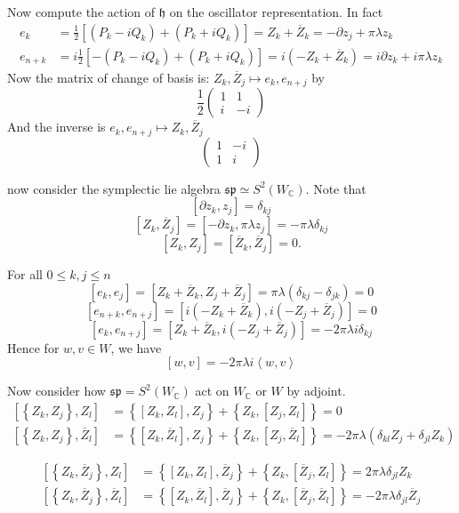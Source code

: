 \documentclass[12pt]{article}
\def\bC{{\mathbb{C}}}
\def\sp{{\mathfrak{sp}}}
\def\inn#1#2{\left\langle{#1},{#2}\right\rangle}
\def\barZ{{\overline{Z}}}
\def\fhh{\mathfrak{h}}
\def\pz#1{\partial z_{#1}}
\def\cmm#1#2{\left[{#1},{#2}\right]}
\def\acmm#1#2{\left\{{#1},{#2}\right\}}
\begin{document}
Now compute the action of $\fhh$ on the oscillator representation. 
In fact 
\[
\begin{split}
e_k &= \frac{1}{2}[(P_k-iQ_k) + (P_k + iQ_k)] =
Z_k + \barZ_k =  -\pz{j}  + \pi \lambda z_k\\
e_{n+k} & = i\frac{1}{2}[-(P_k-iQ_k) + (P_k + iQ_k)] = i(-Z_k+\barZ_k)
= i\pz{k} +i \pi \lambda z_k
\end{split}
\]
Now the matrix of change of basis is: $Z_k, \barZ_j \mapsto e_k, e_{n+j}$
by 
\begin{equation}\label{eq:tZtoe}
\frac{1}{2}\begin{pmatrix}
1 & 1\\
i & -i 
\end{pmatrix}
\end{equation}
And the inverse is $e_k, e_{n+j} \mapsto Z_k, \barZ_j$
\[
\begin{pmatrix}
1 & -i\\
1 & i
\end{pmatrix}
\]

now consider the symplectic lie algebra $\sp \simeq S^2(W_\bC)$. 
Note that 
\[
\cmm{\pz{k}}{z_j} = \delta_{kj}
\]
\[
\cmm{Z_k}{\barZ_j} = \cmm{-\pz{k}}{\pi \lambda z_j} = -\pi\lambda \delta_{kj}
\]
\[
\cmm{Z_k}{Z_j} = \cmm{\barZ_k}{\barZ_j} =0.
\]

For all $0\leq k,j \leq n$
\[
\cmm{e_k}{e_{j}}= \cmm{Z_k+\barZ_k}{Z_j+\barZ_j} = \pi\lambda (\delta_{kj}-\delta_{jk}) 
=0 
\]
\[
\cmm{e_{n+k}}{e_{n+j}} = \cmm{i(-Z_k+\barZ_k)}{i(-Z_j+\barZ_j)} = 0
\]
\[
\cmm{e_k}{e_{n+j}} = \cmm{Z_k + \barZ_k}{i(-Z_j+\barZ_j)} = -2\pi\lambda i \delta_{kj} 
\]
Hence for $w,v\in W$, we have 
\[
\cmm{w}{v}= - 2\pi \lambda i \inn{w}{v} 
\]

Now consider how $\sp = S^2(W_\bC)$ act on $W_\bC$ or $W$ by adjoint.
\begin{align*}
\cmm{\acmm{Z_k}{Z_j}}{Z_l} &= \acmm{\cmm{Z_k}{Z_l}}{Z_j} 
+ \acmm{Z_k}{\cmm{Z_j}{Z_l}} = 0\\
\cmm{\acmm{Z_k}{Z_j}}{\barZ_l} &= \acmm{\cmm{Z_k}{\barZ_l}}{Z_j} 
+ \acmm{Z_k}{\cmm{Z_j}{\barZ_l}} = -2\pi \lambda(\delta_{kl}Z_j+\delta_{jl}Z_k)
\end{align*}

\begin{align*}
 \cmm{\acmm{Z_k}{\barZ_j}}{Z_l} &= \acmm{\cmm{Z_k}{Z_l}}{\barZ_j} 
+ \acmm{Z_k}{\cmm{\barZ_j}{Z_l}} = 2\pi \lambda \delta_{jl} Z_k\\
 \cmm{\acmm{Z_k}{\barZ_j}}{\barZ_l} &= \acmm{\cmm{Z_k}{\barZ_l}}{\barZ_j} 
+ \acmm{Z_k}{\cmm{\barZ_j}{\barZ_l}} = -2\pi \lambda \delta_{jl} \barZ_j
\end{align*}
\end{document}
